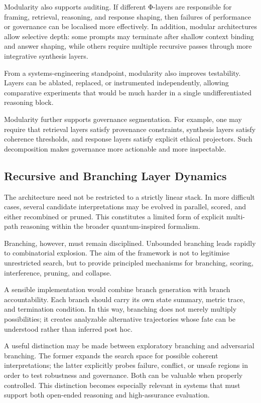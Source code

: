 \documentclass[12pt]{article}
\begin{document}
Modularity also supports auditing. If different Φ-layers are responsible for framing, retrieval, reasoning, and response shaping, then failures of performance or governance can be localised more effectively. In addition, modular architectures allow selective depth: some prompts may terminate after shallow context binding and answer shaping, while others require multiple recursive passes through more integrative synthesis layers.

From a systems-engineering standpoint, modularity also improves testability. Layers can be ablated, replaced, or instrumented independently, allowing comparative experiments that would be much harder in a single undifferentiated reasoning block.

Modularity further supports governance segmentation. For example, one may require that retrieval layers satisfy provenance constraints, synthesis layers satisfy coherence thresholds, and response layers satisfy explicit ethical projectors. Such decomposition makes governance more actionable and more inspectable.

\subsection{Recursive and Branching Layer Dynamics}
The architecture need not be restricted to a strictly linear stack. In more difficult cases, several candidate interpretations may be evolved in parallel, scored, and either recombined or pruned. This constitutes a limited form of explicit multi-path reasoning within the broader quantum-inspired formalism.

Branching, however, must remain disciplined. Unbounded branching leads rapidly to combinatorial explosion. The aim of the framework is not to legitimise unrestricted search, but to provide principled mechanisms for branching, scoring, interference, pruning, and collapse.

A sensible implementation would combine branch generation with branch accountability. Each branch should carry its own state summary, metric trace, and termination condition. In this way, branching does not merely multiply possibilities; it creates analyzable alternative trajectories whose fate can be understood rather than inferred post hoc.

A useful distinction may be made between exploratory branching and adversarial branching. The former expands the search space for possible coherent interpretations; the latter explicitly probes failure, conflict, or unsafe regions in order to test robustness and governance. Both can be valuable when properly controlled. This distinction becomes especially relevant in systems that must support both open-ended reasoning and high-assurance evaluation.
\end{document}
